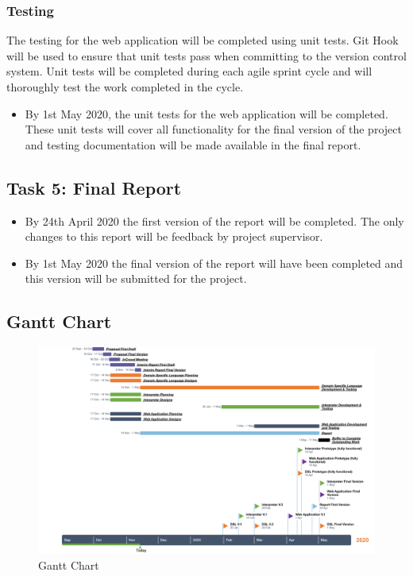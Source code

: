 \documentclass[chapterprefix=false]{scrreprt}
\begin{document}
\subsubsection{Testing}

The testing for the web application will be completed using unit tests. Git Hook will be used to ensure that unit tests pass when committing to the version control system. Unit tests will be completed during each agile sprint cycle and will thoroughly test the work completed in the cycle.

\begin{itemize}
 \setlength\itemsep{-0.75em}
 \item By 1st May 2020, the unit tests for the web application will be completed. These unit tests will cover all functionality for the final version of the project and testing documentation will be made available in the final report.
\end{itemize}

\subsection{Task 5: Final Report}

\begin{itemize}
 \setlength\itemsep{-0.75em}
 \item By 24th April 2020 the first version of the report will be completed. The only changes to this report will be feedback by project supervisor.
 \item By 1st May 2020 the final version of the report will have been completed and this version will be submitted for the project.
\end{itemize}

\subsection{Gantt Chart}

\begin{figure}
    \centering
        \includegraphics[width=230mm,scale=0.5]{project-outline-2}
        \newline
        \caption{Gantt Chart}
\end{figure}
\end{document}
